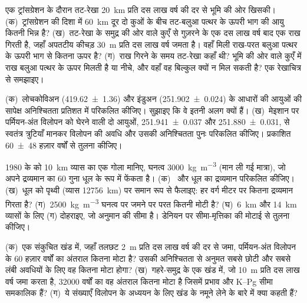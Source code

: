 \begin{exercise}[$\star\star$]\label{exo:b1:stratigraphic-scale:6}
एक ट्रांसग्रेशन के दौरान तट-रेखा \qty{20}{km} प्रति दस लाख वर्ष की दर से भूमि की ओर खिसकी। (क)~ट्रांसग्रेशन की दिशा में \qty{60}{km} दूर दो कुओं के बीच तट-बलुआ पत्थर के ऊपरी भाग की आयु कितनी भिन्न है? (ख)~तट-रेखा के समुद्र की ओर वाले कुएँ से गुज़रने के एक दस लाख वर्ष बाद एक राख गिरती है, जहाँ अपतटीय कीचड़ \qty{30}{m} प्रति दस लाख वर्ष जमता है। वहाँ मिली राख-परत बलुआ पत्थर के ऊपरी भाग से कितना ऊपर है? (ग)~राख गिरने के समय तट-रेखा कहाँ थी? भूमि की ओर वाले कुएँ में राख बलुआ पत्थर के ऊपर मिलती है या नीचे, और वहाँ वह बिल्कुल क्यों न मिल सकती है? एक रेखाचित्र से समझाइए।
\end{exercise}

\begin{exercise}[$\star\star$]\label{exo:b1:stratigraphic-scale:7}
(क)~लोचकोविअन (\qty[uncertainty-mode=separate]{419.62(136)}{\Ma}) और इंडुअन (\qty[uncertainty-mode=separate]{251.902(24)}{\Ma}) के आधारों की आयुओं की सापेक्ष अनिश्चितता प्रतिशत में परिकलित कीजिए। सुझाइए कि वे इतनी अलग क्यों हैं। (ख)~मेइशान पर पर्मियन-अंत विलोपन को घेरने वाली दो आयुओं, \qty[uncertainty-mode=separate]{251.941(37)}{\Ma} और \qty[uncertainty-mode=separate]{251.880(31)}{\Ma}, से स्वतंत्र त्रुटियाँ मानकर विलोपन की अवधि और उसकी अनिश्चितता पुनः परिकलित कीजिए। प्रकाशित \num[uncertainty-mode=separate]{60 \pm 48} हज़ार वर्षों से तुलना कीजिए।
\end{exercise}

\begin{exercise}[$\star\star$]\label{exo:b1:stratigraphic-scale:8}
1980 के  को \qty{10}{km} व्यास का एक गोला मानिए, घनत्व \qty{3000}{kg.m^{-3}} (मान ली गई मात्रा), जो अपने द्रव्यमान का 60 गुना धूल के रूप में फेंकता है। (क)~ और धूल का द्रव्यमान परिकलित कीजिए। (ख)~धूल को पृथ्वी (व्यास \qty{12756}{km}) पर समान रूप से फैलाइए: हर वर्ग मीटर पर कितना द्रव्यमान गिरता है? (ग)~\qty{2500}{kg.m^{-3}} घनत्व पर जमने पर परत कितनी मोटी है? (घ)~\qty{6}{km} और \qty{14}{km} व्यासों के लिए (ग) दोहराइए, जो अनुमान की सीमा है। डेनियन  पर सीमा-मृत्तिका की मोटाई से तुलना कीजिए।
\end{exercise}

\begin{exercise}[$\star\star$]\label{exo:b1:stratigraphic-scale:9}
(क)~एक संकुचित खंड में, जहाँ तलछट \qty{2}{m} प्रति दस लाख वर्ष की दर से जमा, पर्मियन-अंत विलोपन के \num{60} हज़ार वर्षों का अंतराल कितना मोटा है? उसकी अनिश्चितता से अनुमत सबसे छोटी और सबसे लंबी अवधियों के लिए वह कितना मोटा होगा? (ख)~गहरे-समुद्र के एक खंड में, जो \qty{10}{m} प्रति दस लाख वर्ष जमा करता है, \num{32000} वर्षों का वह अंतराल कितना मोटा है जिसमें प्रभाव और K--Pg सीमा समकालिक हैं? (ग)~ये संख्याएँ विलोपन के अध्ययन के लिए खंड के नमूने लेने के बारे में क्या कहती हैं?
\end{exercise}

